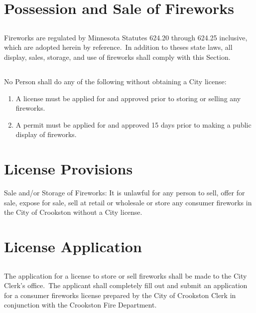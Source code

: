 \section{Possession and Sale of Fireworks}
\subsection{}
Fireworks are regulated by Minnesota Statutes 624.20 through 624.25 inclusive, which are adopted herein by reference. In addition to theses state laws, all display, sales, storage, and use of fireworks shall comply with this Section.
\subsection{}
No Person shall do any of the following without obtaining a City license:
\begin{enumerate}[{\indent}1)]
    \item A license must be applied for and approved prior to storing or selling any fireworks. 
    \item A permit must be applied for and approved 15 days prior to making a public display of fireworks. 
\end{enumerate}

\section{License Provisions}
Sale and/or Storage of Fireworks: It is unlawful for any person to sell, offer for sale, expose for sale, sell at retail or wholesale or store any consumer fireworks in the City of Crookston without a City license.

\section{License Application}
\subsection{}
The application for a license to store or sell fireworks shall be made to the City Clerk's office. The applicant shall completely fill out and submit an application for a consumer fireworks license prepared by the City of Crookston Clerk in conjunction with the Crookston Fire Department.  
